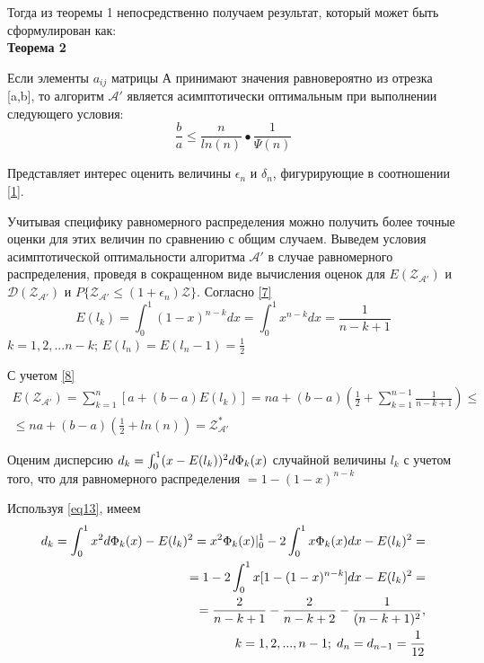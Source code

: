 \documentclass[a4paper, 14pt]{extarticle}
\begin{document}
Тогда из теоремы 1 непосредственно получаем результат, который может быть сформулирован как:\\

\textbf{Теорема 2}

Если элементы $a_{ij}$ матрицы А принимают значения равновероятно из отрезка [a,b], то алгоритм $\mathcal{A'}$ является асимптотически оптимальным при выполнении следующего условия:
\begin{equation}
\frac{b}{a} \leq \frac{n}{ln(n)}•\frac{1}{\Psi(n)}
\end{equation}

Представляет интерес оценить величины $\epsilon_n$ и $\delta_n$, фигурирующие в соотношении \eqref{1}.

Учитывая специфику равномерного распределения можно получить более точные оценки для этих величин по сравнению с общим случаем. Выведем условия асимптотической оптимальности алгоритма $\mathcal{A'}$ в случае равномерного распределения, проведя в сокращенном виде вычисления оценок для $E(\mathcal{Z_{A'}})$ и $\mathcal{D(Z_{A'})}$ и $P \{ \mathcal{Z_{A'}} \leq (1+\epsilon_n)\mathcal{Z} \}$. Согласно \eqref{7}
\begin{equation}\label{eq13} 
E(l_k) = \int_0^1 (1-x)^{n-k}dx = \int_0^1 x^{n-k}dx = \frac{1}{n-k+1}
\end{equation}
$k=1,2,...n-k$;   $ E(l_n) = E(l_n-1) = \frac{1}{2}$

С учетом \eqref{8}
\begin{equation}
\begin{aligned}
E(\mathcal{Z_{A'}}) = \sum_{k=1}^{n} [a+(b-a)E(l_k)] = na +(b-a)(\frac{1}{2}+\sum_{k=1}^{n-1} \frac{1}{n-k+1}) \leq \\
\leq na+(b-a)(\frac{1}{2} + ln(n)) = \mathcal{Z^*_{A'}}
\end{aligned}
\end{equation}

Оценим дисперсию $d_k=\int_0^1 (x-E(l_k))^2 d\text{$\Phi_k(x)$}$ случайной величины $l_k$ с учетом того, что для равномерного распределения \chanceLklesserX $ = 1-(1-x)^{n-k}$

Используя \eqref{eq13}, имеем
\begin{equation}
\begin{aligned}
d_k = \int_0^1 x^2 d \text{$\Phi_k(x)$}-E(l_k)^2=x^2 \text{$\Phi_k(x)$} 	
|_0^1 - 2 \int_0^1 x \text{$\Phi_k(x)$}dx - E(l_k)^2=\\
= 1-2\int_0^1 x[1-(1-x)^{n-k}]dx-E(l_k)^2 =\\
= \frac{2}{n-k+1} - \frac{2}{n-k+2} - \frac{1}{(n-k+1)^2}, \\ 
\; k=1,2,...,n-1; \; d_n = d_{n-1} = \frac{1}{12}
\end{aligned}
\end{equation}
\end{document}
